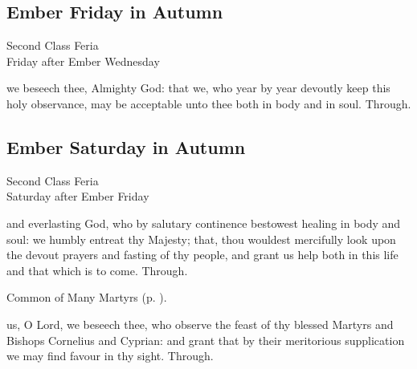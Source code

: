\subsection{Ember Friday in Autumn}
\begin{inhead}
    {Second Class Feria\\
Friday after Ember Wednesday}
\end{inhead}


{} we beseech thee, Almighty God: that we, who year by year devoutly keep this holy observance, may be acceptable unto thee both in body and in soul. Through.


\subsection{Ember Saturday in Autumn}
\begin{inhead}
    {Second Class Feria\\
Saturday after Ember Friday}
\end{inhead}


{} and everlasting God, who by salutary continence bestowest healing in body and soul: we humbly entreat thy Majesty; that, thou wouldest mercifully look upon the devout prayers and fasting of thy people, and grant us help both in this life and that which is to come. Through.



\begin{rubric}
	Common of Many Martyrs (p. \pageref{CommonMartyrs}).
\end{rubric}

{} us, O Lord, we beseech thee, who observe the feast of thy blessed Martyrs and Bishops Cornelius and Cyprian: and grant that by their meritorious supplication we may find favour in thy sight. Through.

